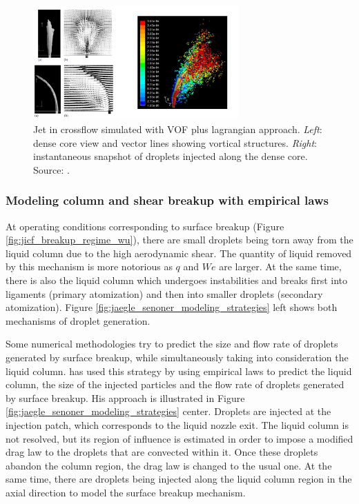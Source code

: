 \begin{figure}[ht]
    \centering
    \includegraphics[width=0.7\textwidth]{./part1_numerical_approaches/figures_ch3/arienti_2006_jicf}
       \centering
    \caption[Jet in crossflow simulated with VOF plus lagrangian approach.]{Jet in crossflow simulated with VOF plus lagrangian approach. \textsl{Left}: dense core view and vector lines showing vortical structures. \textsl{Right}: instantaneous snapshot of droplets injected along the dense core. Source: .}
    \label{fig:arienti_2006_jicf}
\end{figure}


\subsubsection*{Modeling column and shear breakup with empirical laws }

At operating conditions corresponding to surface breakup (Figure \ref{fig:jicf_breakup_regime_wu}), there are small droplets being torn away from the liquid column due to the high aerodynamic shear. The quantity of liquid removed by this mechanism is more notorious as $q$ and $We$ are larger. At the same time, there is also the liquid column which undergoes instabilities and breaks first into ligaments (primary atomization) and then into smaller droplets (secondary atomization). Figure \ref{fig:jaegle_senoner_modeling_strategies} left shows both mechanisms of droplet generation.

Some numerical methodologies try to predict the size and flow rate of droplets generated by surface breakup, while simultaneously taking into consideration the liquid column.  has used this strategy by using empirical laws to predict the liquid column, the size of the injected particles and the flow rate of droplets generated by surface breakup. His approach is illustrated in Figure \ref{fig:jaegle_senoner_modeling_strategies} center. Droplets are injected at the injection patch, which corresponds to the liquid nozzle exit. The liquid column is not resolved, but its region of influence is estimated in order to impose a modified drag law to the droplets that are convected within it. Once these droplets abandon the column region, the drag law is changed to the usual one. At the same time, there are droplets being injected along the liquid column region in the axial direction to model the surface breakup mechanism.

